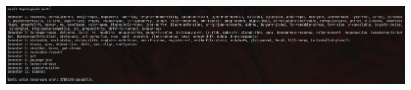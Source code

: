 \documentclass{article}
\let\origfigure\figure
\let\endorigfigure\endfigure
\renewenvironment{figure}[1][2] {
    \expandafter\origfigure\expandafter[H]
} {
    \endorigfigure
}
\begin{document}


\begin{figure}
  \includegraphics[scale=0.25]{8.png}
  \caption{\textit{input}}
\end{figure}
\end{document}
